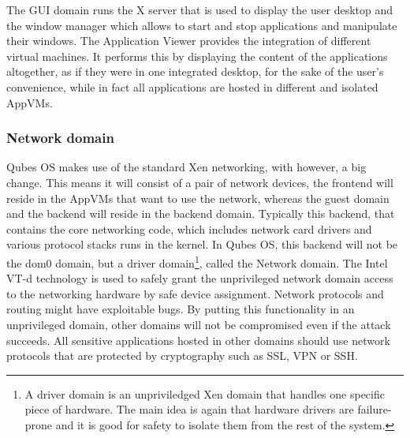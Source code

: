 \documentclass[runningheads,a4paper]{article}
\begin{document}
The GUI domain runs the X server that is used to display the user desktop and
the window manager which allows to start and stop applications and
manipulate their windows. The Application Viewer provides the
integration of different virtual machines. It performs this by displaying the
content of the applications altogether, as if they were in one integrated desktop, for
the sake of the user's convenience, while in fact all applications are hosted in different and isolated AppVMs.


\subsubsection{Network domain}

Qubes OS makes use of the standard Xen networking, with however, a
big change. This means it will consist of a pair of network devices,
the frontend will reside in the AppVMs that want to use the network, whereas the
guest domain and the backend will reside in the backend
domain. Typically this backend, that contains the core networking
code, which includes network card drivers and various protocol stacks
runs in the kernel. In Qubes OS, this backend will not be the dom0
domain, but a driver domain\footnote{A driver domain is an
unpriviledged Xen domain that handles one specific piece of
hardware. The main idea is again that hardware drivers are
failure-prone and it is good for safety to isolate them from the rest
of the system.}, called the Network domain. The Intel VT-d technology
is used to safely grant the unprivileged network domain access to
the networking hardware by safe device assignment. Network protocols
and routing might have exploitable bugs. By putting this functionality
in an unprivileged domain, other domains will not be compromised even
if the attack succeeds. All sensitive applications hosted in other
domains should use network protocols that are protected by
cryptography such as SSL, VPN or SSH.
\end{document}
